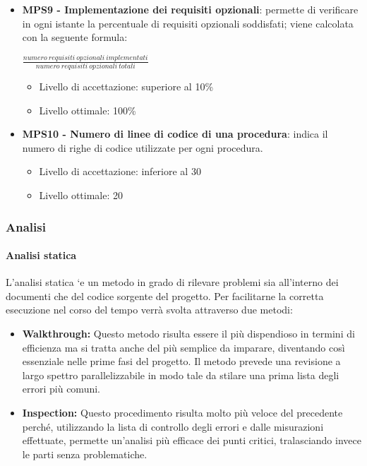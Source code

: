 \documentclass[11pt,a4paper]{article}
\begin{document}
{\begin{itemize}
	 \item \textbf{MPS9 - Implementazione dei requisiti opzionali}: permette di verificare in ogni istante la percentuale di requisiti opzionali soddisfati; viene calcolata con la seguente formula: 
		\begin{center}
		$\frac{numero\ requisiti\ opzionali\ implementati}{numero\ requisiti\ opzionali\ totali}$
	\end{center}
	\begin{itemize}
	 \item Livello di accettazione: superiore al 10\%
	 \item Livello ottimale: 100\%
	 \end{itemize}
	 
	  \item \textbf{MPS10 - Numero di linee di codice di una procedura}: indica il numero di righe di codice utilizzate per ogni procedura.
	\begin{itemize}
	 \item Livello di accettazione: inferiore al 30
	 \item Livello ottimale: 20
	 \end{itemize}
	
	\end{itemize}
	
	\subsubsection{Analisi}
	\paragraph{Analisi statica\\}
	L'analisi statica `e un metodo in grado di rilevare problemi sia all'interno dei documenti che del codice sorgente del progetto. Per facilitarne la corretta esecuzione nel corso del tempo verrà svolta attraverso due metodi:
\begin{itemize}
	\item\textbf{Walkthrough:} Questo metodo risulta essere il più dispendioso in termini di efficienza ma si tratta anche del più semplice da imparare, diventando così essenziale nelle prime fasi del progetto. Il  metodo  prevede  una  revisione  a  largo  spettro  parallelizzabile  in  modo  tale  da stilare una prima lista degli errori più comuni.
	\item \textbf{Inspection:} Questo procedimento risulta molto più veloce del precedente perché, utilizzando la lista di controllo degli errori e dalle misurazioni effettuate, permette un'analisi più efficace dei punti critici, tralasciando invece le parti senza problematiche.
	\end{itemize}
	
}
\end{document}
